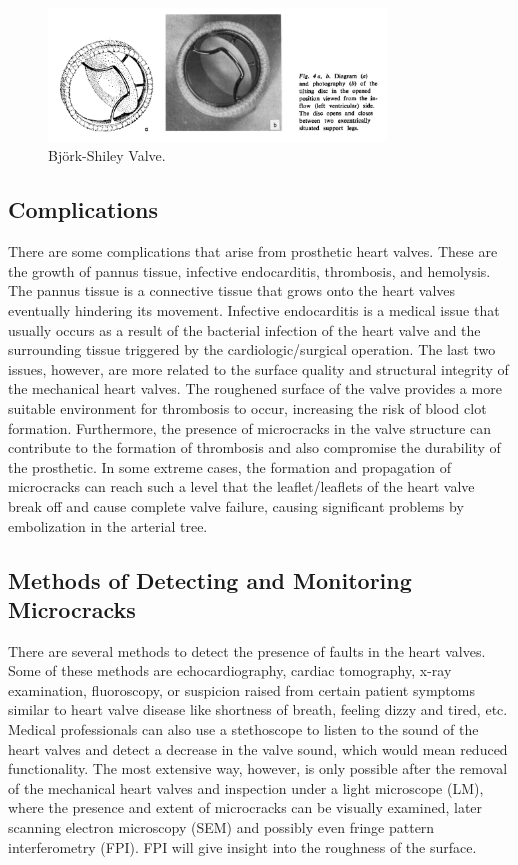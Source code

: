 \begin{figure}
    \centering
    \includegraphics[width=0.8\textwidth]{björkshileyvalve.png}
    \caption{Björk-Shiley Valve. \cite*{björk1969}}
    \label{fig:björkshileyvalve}
\end{figure}
\vspace{1pt}

\subsection*{Complications}
There are some complications that arise from prosthetic heart valves. These are the growth of pannus tissue, infective endocarditis, thrombosis, and hemolysis.\cite*{roudaut2007} \cite*{barmada1998} The pannus tissue is a connective tissue that grows onto the heart valves eventually hindering its movement. Infective endocarditis is a medical issue that usually occurs as a result of the bacterial infection of the heart valve and the surrounding tissue triggered by the cardiologic/surgical operation. The last two issues, however, are more related to the surface quality and structural integrity of the mechanical heart valves. The roughened surface of the valve provides a more suitable environment for thrombosis to occur, increasing the risk of blood clot formation. Furthermore, the presence of microcracks in the valve structure can contribute to the formation of thrombosis and also compromise the durability of the prosthetic. In some extreme cases, the formation and propagation of microcracks can reach such a level that the leaflet/leaflets of the heart valve break off and cause complete valve failure, causing significant problems by embolization in the arterial tree.\cite*{vansteenbergen2019}
\subsection*{Methods of Detecting and Monitoring Microcracks}
There are several methods to detect the presence of faults in the heart valves. Some of these methods are echocardiography, cardiac tomography, x-ray examination, fluoroscopy, or suspicion raised from certain patient symptoms similar to heart valve disease like shortness of breath, feeling dizzy and tired, etc. Medical professionals can also use a stethoscope to listen to the sound of the heart valves and detect a decrease in the valve sound, which would mean reduced functionality. The most extensive way, however, is only possible after the removal of the mechanical heart valves and inspection under a light microscope (LM), where the presence and extent of microcracks can be visually examined, later scanning electron microscopy (SEM) and possibly even fringe pattern interferometry (FPI).\cite*{barmada1998} FPI will give insight into the roughness of the surface.

